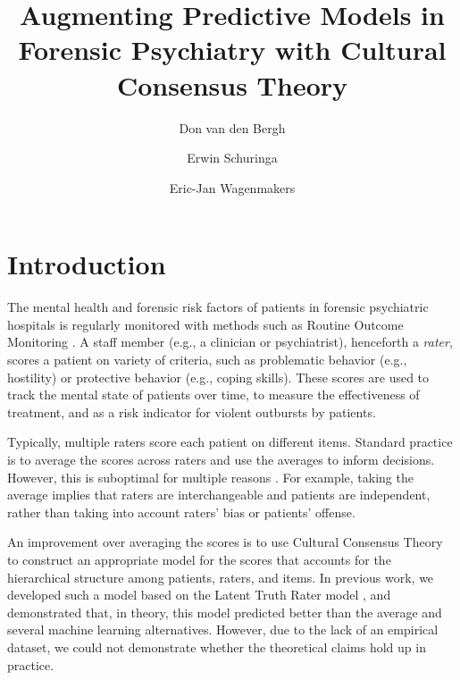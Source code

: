 \documentclass[a4paper,11pt]{article}
\title{Augmenting Predictive Models in Forensic Psychiatry with Cultural Consensus Theory}
\author[1]{Don van den Bergh}
\author[2]{Erwin Schuringa}
\author[1]{Eric-Jan Wagenmakers}
\affil[1]{Department of Psychological Methods, University of Amsterdam}
\affil[2]{Forensic Psychiatric Center Dr. S. van Mesdag}
\date{}
\begin{document}
\maketitle

\tableofcontents

\begin{abstract}

\end{abstract}

\section{Introduction}
The mental health and forensic risk factors of patients in forensic psychiatric hospitals is regularly monitored with methods such as
Routine Outcome Monitoring \parencite{deBeurs2011ROM}.
A staff member (e.g., a clinician or psychiatrist), henceforth a \emph{rater}, scores a patient on variety of criteria, such as problematic behavior (e.g., hostility) or protective behavior (e.g., coping skills).
These scores are used to track the mental state of patients over time, to measure the effectiveness of treatment, and as a risk indicator for violent outbursts by patients.

Typically, multiple raters score each patient on different items.
Standard practice is to average the scores across raters and use the averages to inform decisions.
However, this is suboptimal for multiple reasons \parencite{vandenBergh2020cultural}.
For example, taking the average implies that raters are interchangeable and patients are independent, rather than taking into account raters' bias or patients' offense.


An improvement over averaging the scores is to use Cultural Consensus Theory \parencite[CCT;][]{romney1986culture, batchelder1988test, batchelder2012cultural} to construct an appropriate model for the scores that accounts for the hierarchical structure among patients, raters, and items. 
In previous work, we developed such a model based on the Latent Truth Rater model \parencite[LTM; ][]{Anders2015cultural}, and demonstrated that, in theory, this model predicted better than the average and several machine learning alternatives.
However, due to the lack of an empirical dataset, we could not demonstrate whether the theoretical claims hold up in practice.
\end{document}
